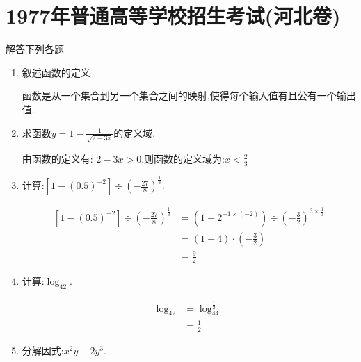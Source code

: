 \section*{1977年普通高等学校招生考试(河北卷)}

\begin{questions}
	\question 解答下列各题
	\begin{enumerate}[label=(\arabic*)]
		\item 叙述函数的定义
		      \begin{solution}
			      函数是从一个集合到另一个集合之间的映射,使得每个输入值有且公有一个输出值.
		      \end{solution}
		\item 求函数$y=1-\frac{1}{\sqrt{2-3x}}$的定义域.
		      \begin{solution}
			      由函数的定义有:
			      \begin{math}
				      2-3x > 0
			      \end{math},则函数的定义域为:$x<\frac23$
		      \end{solution}
		\item 计算:$\left[1-(0.5)^{-2}\right] \div \left(-\frac{27}{8}\right)^{\frac13}$.
		      \begin{solution}
			      \begin{align*}
				      \left[1-(0.5)^{-2}\right] \div \left(-\frac{27}{8}\right)^{\frac13} & = \left(1-2^{-1\times (-2)}\right)
				      \div \left(-\frac32\right)^{3\times\frac13}                                                              \\
				                                                                          & = (1 - 4) \cdot (-\frac32)         \\
				                                                                          & = \frac92
			      \end{align*}
		      \end{solution}
		\item 计算:$\log_42$.
		      \begin{solution}
			      \begin{align*}
				      \log_42 & = \log_44^\frac12 \\
				              & = \frac12
			      \end{align*}
		      \end{solution}
		\item 分解因式:$x^2y - 2y^3$.
		      \begin{solution}
			      \begin{align*}

\end{align*}
\end{solution}
\end{enumerate}
\end{questions}
